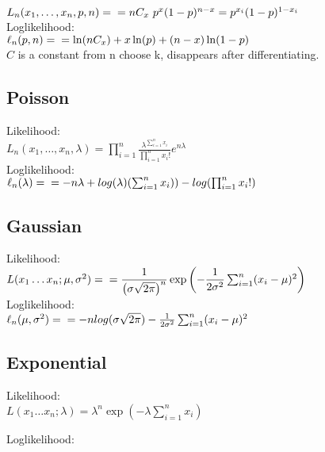 $L_ n(x_1, \ldots , x_ n, p,n) =\\
= nC_x~p^x(1-p)^{n-x} = p^{x_i}(1-p)^{1-x_i}$\\

Loglikelihood:\\

$\ell_n (p,n)  = \\
 = \ln(nC_x)+x\ln(p)+(n-x)\ln(1-p)$\\
 
$C$ is a constant from n choose k, disappears after differentiating.

\subsection*{Poisson}
Likelihood:\\
$L_ n(x_1, \ldots , x_ n, \lambda) = \prod _{i = 1}^ n \frac{\lambda^{\sum_{i=1}^{n} x_i}}{\prod _{i = 1}^ n x_i!} e^{n\lambda}$\\

Loglikelihood:\\
$\ell_n (\lambda)= \\
= -n\lambda + log(\lambda)(\sum_{i=1}^n x_i)) - log(\prod _{i = 1}^ n x_i!)$


\subsection*{Gaussian}

Likelihood:\\

$L(x_1\dots x_n;\mu,\sigma^2)=\\ 
= \dfrac{1}{\left(\sigma\sqrt{2\pi}\right)^n}\exp{\left(-\dfrac{1}{2\sigma^2}\sum_{i=1}^n (x_i-\mu)^2 \right)}$\\

Loglikelihood:\\

$\ell_n (\mu,\sigma^2)= \\
= -n log(\sigma\sqrt{2\pi})-\frac{1}{2\sigma^2}\sum_{i=1}^n (x_i-\mu)^2 $


\subsection*{Exponential}

Likelihood:\\
$L(x_1\dots x_n;\lambda)=\lambda^n\exp\left(-\lambda\sum_{i=1}^n x_i\right)$

Loglikelihood:\\

